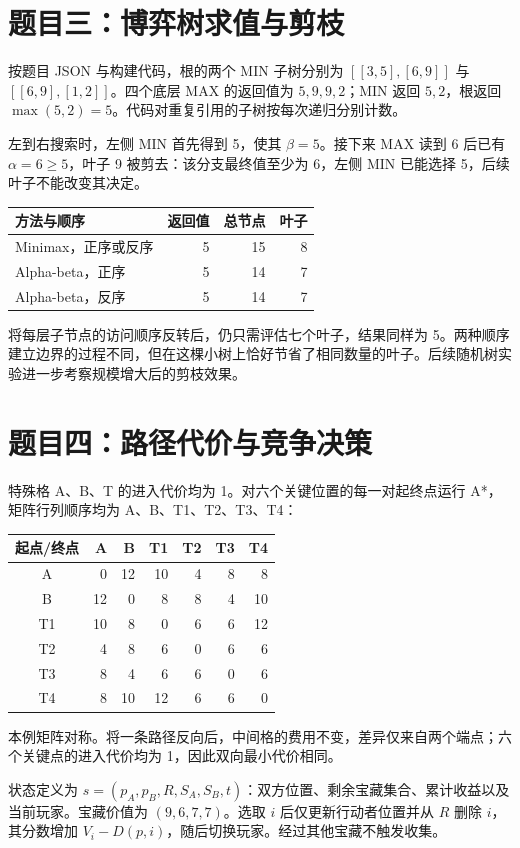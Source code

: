 \documentclass[UTF8,a4paper,zihao=5]{ctexart}
\begin{document}
\section{题目三：博弈树求值与剪枝}
按题目 JSON 与构建代码，根的两个 MIN 子树分别为 $[[3,5],[6,9]]$ 与 $[[6,9],[1,2]]$。四个底层 MAX 的返回值为 $5,9,9,2$；MIN 返回 $5,2$，根返回 $\max(5,2)=5$。代码对重复引用的子树按每次递归分别计数。

左到右搜索时，左侧 MIN 首先得到 5，使其 $\beta=5$。接下来 MAX 读到 6 后已有 $\alpha=6\geq5$，叶子 9 被剪去：该分支最终值至少为 6，左侧 MIN 已能选择 5，后续叶子不能改变其决定。
\begin{center}
\begin{tabular}{lrrr}\toprule
方法与顺序 & 返回值 & 总节点 & 叶子\\\midrule
Minimax，正序或反序 &5&15&8\\
Alpha-beta，正序 &5&14&7\\
Alpha-beta，反序 &5&14&7\\\bottomrule
\end{tabular}
\end{center}
将每层子节点的访问顺序反转后，仍只需评估七个叶子，结果同样为 5。两种顺序建立边界的过程不同，但在这棵小树上恰好节省了相同数量的叶子。后续随机树实验进一步考察规模增大后的剪枝效果。

\section{题目四：路径代价与竞争决策}
特殊格 A、B、T 的进入代价均为 1。对六个关键位置的每一对起终点运行 A*，矩阵行列顺序均为 A、B、T1、T2、T3、T4：
\begin{center}
\begin{tabular}{c|rrrrrr}\toprule
起点/终点&A&B&T1&T2&T3&T4\\\midrule
A&0&12&10&4&8&8\\
B&12&0&8&8&4&10\\
T1&10&8&0&6&6&12\\
T2&4&8&6&0&6&6\\
T3&8&4&6&6&0&6\\
T4&8&10&12&6&6&0\\\bottomrule
\end{tabular}
\end{center}
本例矩阵对称。将一条路径反向后，中间格的费用不变，差异仅来自两个端点；六个关键点的进入代价均为 1，因此双向最小代价相同。

状态定义为 $s=(p_A,p_B,R,S_A,S_B,t)$：双方位置、剩余宝藏集合、累计收益以及当前玩家。宝藏价值为 $(9,6,7,7)$。选取 $i$ 后仅更新行动者位置并从 $R$ 删除 $i$，其分数增加 $V_i-D(p,i)$，随后切换玩家。经过其他宝藏不触发收集。
\end{document}
